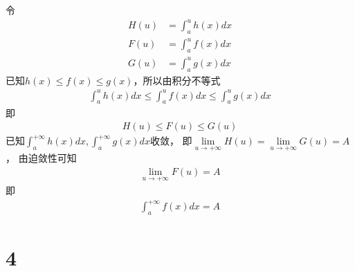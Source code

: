 \documentclass{article}
\begin{document}
\begin{itemize}
        令
        \begin{align*}
          H(u) & = \int_{a}^{u} h(x) dx \\
          F(u) & = \int_{a}^{u} f(x) dx \\
          G(u) & = \int_{a}^{u} g(x) dx
        \end{align*}
        已知$h(x) \leq f(x) \leq g(x)$，所以由积分不等式
        \begin{align*}
          \int_{a}^{u} h(x) dx \leq \int_{a}^{u} f(x) dx \leq \int_{a}^{u} g(x) dx
        \end{align*}
        即
        \begin{align*}
          H(u) \leq F(u) \leq G(u)
        \end{align*}
        已知$\int_{a}^{+\infty} h(x) dx, \int_{a}^{+\infty} g(x) dx$收敛，
        即$\lim \limits_{u \to +\infty} H(u) = \lim \limits_{u \to +\infty} G(u) = A$，
        由迫敛性可知
        \begin{align*}
          \lim \limits_{u \to +\infty} F(u) = A
        \end{align*}
        即
        \begin{align*}
          \int_{a}^{+\infty} f(x) dx = A
        \end{align*}
\end{itemize}

\section*{4}
\end{document}
